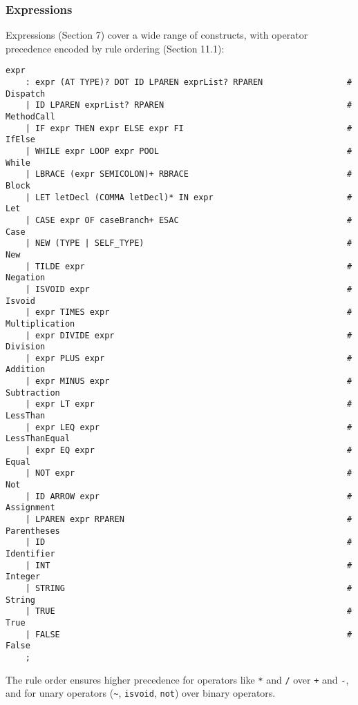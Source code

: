 \documentclass[11pt, titlepage]{article}
\begin{document}
\subsubsection{Expressions}
Expressions (Section 7) cover a wide range of constructs, with operator precedence encoded by rule ordering (Section 11.1):
\begin{lstlisting}
expr
    : expr (AT TYPE)? DOT ID LPAREN exprList? RPAREN                 # Dispatch
    | ID LPAREN exprList? RPAREN                                     # MethodCall
    | IF expr THEN expr ELSE expr FI                                 # IfElse
    | WHILE expr LOOP expr POOL                                      # While
    | LBRACE (expr SEMICOLON)+ RBRACE                                # Block
    | LET letDecl (COMMA letDecl)* IN expr                           # Let
    | CASE expr OF caseBranch+ ESAC                                  # Case
    | NEW (TYPE | SELF_TYPE)                                         # New
    | TILDE expr                                                     # Negation
    | ISVOID expr                                                    # Isvoid
    | expr TIMES expr                                                # Multiplication
    | expr DIVIDE expr                                               # Division
    | expr PLUS expr                                                 # Addition
    | expr MINUS expr                                                # Subtraction
    | expr LT expr                                                   # LessThan
    | expr LEQ expr                                                  # LessThanEqual
    | expr EQ expr                                                   # Equal
    | NOT expr                                                       # Not
    | ID ARROW expr                                                  # Assignment
    | LPAREN expr RPAREN                                             # Parentheses
    | ID                                                             # Identifier
    | INT                                                            # Integer
    | STRING                                                         # String
    | TRUE                                                           # True
    | FALSE                                                          # False
    ;
\end{lstlisting}
The rule order ensures higher precedence for operators like \texttt{*} and \texttt{/} over \texttt{+} and \texttt{-}, and for unary operators (\texttt{\textasciitilde}, \texttt{isvoid}, \texttt{not}) over binary operators.
\end{document}
